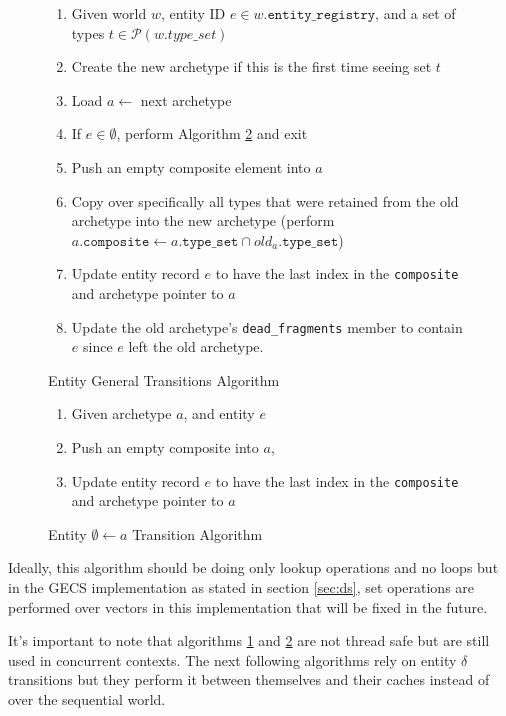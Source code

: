 \begin{figure}[htbp]
    \begin{enumerate}
        \item Given world $w$, entity ID $e \in w.\texttt{entity\_registry}$, and a set of types $t \in \mathcal{P}(w.type\_set)$
        \item Create the new archetype if this is the first time seeing set $t$
        \item Load $a \leftarrow$ next archetype
        \item If $e \in \emptyset$, perform Algorithm \ref{alg:empty_to_a} and exit
        \item Push an empty composite element into $a$
        \item Copy over specifically all types that were retained from the old archetype into the new archetype (perform $a.\texttt{composite} \leftarrow a.\texttt{type\_set} \cap old_a.\texttt{type\_set}$)
        \item Update entity record $e$ to have the last index in the \texttt{composite} and archetype pointer to $a$
        \item Update the old archetype's \texttt{dead\_fragments} member to contain $e$ since $e$ left the old archetype.
    \end{enumerate} 
    \caption{Entity General Transitions Algorithm}
    \label{alg:transition}
\end{figure}

\begin{figure}[htbp]
\begin{enumerate}
    \item Given archetype $a$, and entity $e$ 
    \item Push an empty composite into $a$,
    \item Update entity record $e$ to have the last index in the \texttt{composite} and archetype pointer to $a$
\end{enumerate}
\caption{Entity $\emptyset \leftarrow a$ Transition Algorithm}
\label{alg:empty_to_a}
\end{figure}

Ideally, this algorithm should be doing only lookup operations and no loops but in the GECS implementation as stated in section \ref{sec:ds}, set operations are performed over vectors in this implementation that will be fixed in the future.

It's important to note that algorithms \ref{alg:transition} and \ref{alg:empty_to_a} are not thread safe but are still used in concurrent contexts. The next following algorithms rely on entity $\delta$ transitions but they perform it between themselves and their caches instead of over the sequential world.

